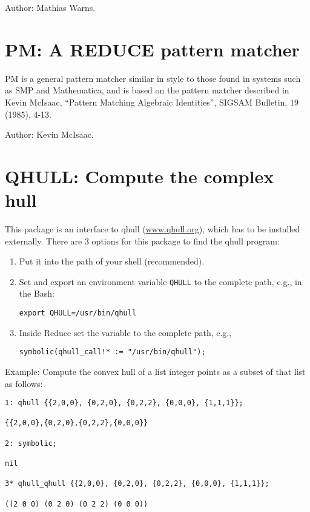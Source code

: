 Author: Mathias Warns.



\newpage

\section{PM: A REDUCE pattern matcher} 

PM is a general pattern matcher similar in style to those found in systems
such as SMP and Mathematica, and is based on the pattern matcher described
in Kevin McIsaac, ``Pattern Matching Algebraic Identities'', SIGSAM Bulletin,
19 (1985), 4-13.

Author: Kevin McIsaac.



\newpage


\section{QHULL: Compute the complex hull}


This package is an interface to qhull (\url{www.qhull.org}), which has to be installed
externally. There are 3 options for this package to find the qhull program:
\begin{enumerate}
\item Put it into the path of your shell (recommended).
\item Set and export an environment variable \texttt{QHULL} to the complete path, e.g., in
the Bash:
\begin{verbatim}
export QHULL=/usr/bin/qhull
\end{verbatim}
\item Inside Reduce set the variable  to the complete path, e.g.,
\begin{verbatim}
symbolic(qhull_call!* := "/usr/bin/qhull");
\end{verbatim}
\end{enumerate}
Example: 
Compute the convex hull of a list integer points as a subset
of that list as follows:
\begin{verbatim}
1: qhull {{2,0,0}, {0,2,0}, {0,2,2}, {0,0,0}, {1,1,1}};

{{2,0,0},{0,2,0},{0,2,2},{0,0,0}}

2: symbolic;

nil

3* qhull_qhull {{2,0,0}, {0,2,0}, {0,2,2}, {0,0,0}, {1,1,1}};

((2 0 0) (0 2 0) (0 2 2) (0 0 0))
\end{verbatim}

